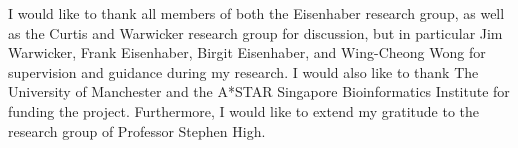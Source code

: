 \documentclass[12pt,PhD,twoside]{muthesis}
\begin{document}
I would like to thank all members of both the Eisenhaber research group, as well as the Curtis and Warwicker research group for discussion, but in particular Jim Warwicker, Frank Eisenhaber, Birgit Eisenhaber, and Wing-Cheong Wong for supervision and guidance during my research. I would also like to thank The University of Manchester and the A*STAR Singapore Bioinformatics Institute for funding the project. Furthermore, I would like to extend my gratitude to the research group of Professor Stephen High.





\end{document}
